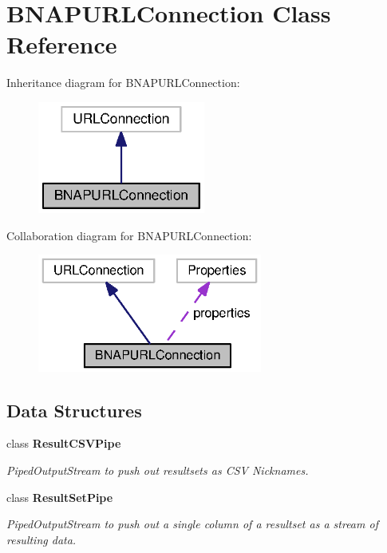 \section{B\+N\+A\+P\+U\+R\+L\+Connection Class Reference}
\label{classorg_1_1smallfoot_1_1parser_1_1bnapsql_1_1BNAPURLConnection}


Inheritance diagram for B\+N\+A\+P\+U\+R\+L\+Connection\+:\nopagebreak
\begin{figure}[H]
\begin{center}
\leavevmode
\includegraphics[width=156pt]{classorg_1_1smallfoot_1_1parser_1_1bnapsql_1_1BNAPURLConnection__inherit__graph}
\end{center}
\end{figure}


Collaboration diagram for B\+N\+A\+P\+U\+R\+L\+Connection\+:
\nopagebreak
\begin{figure}[H]
\begin{center}
\leavevmode
\includegraphics[width=209pt]{classorg_1_1smallfoot_1_1parser_1_1bnapsql_1_1BNAPURLConnection__coll__graph}
\end{center}
\end{figure}
\subsection*{Data Structures}
\begin{DoxyCompactItemize}
\item 
class {\bfseries Result\+C\+S\+V\+Pipe}
\begin{DoxyCompactList}\small\item\em Piped\+Output\+Stream to push out resultsets as C\+S\+V Nicknames. \end{DoxyCompactList}\item 
class {\bfseries Result\+Set\+Pipe}
\begin{DoxyCompactList}\small\item\em Piped\+Output\+Stream to push out a single column of a resultset as a stream of resulting data. \end{DoxyCompactList}\end{DoxyCompactItemize}

